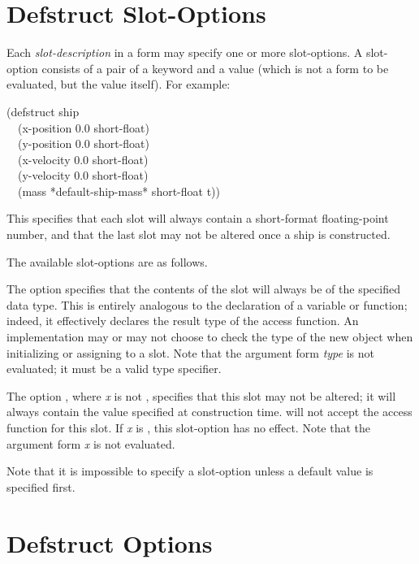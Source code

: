 \section{Defstruct Slot-Options}
\label{Defstruct-Slot-Options}

Each \emph{slot-description} in a  form may specify one or more
slot-options.  A slot-option consists of a pair of a keyword and
a value (which is not a form to be evaluated, but the value itself).
For example:
\begin{lisp}
(defstruct ship \\
~~(x-position 0.0  short-float) \\
~~(y-position 0.0  short-float) \\
~~(x-velocity 0.0  short-float) \\
~~(y-velocity 0.0  short-float) \\
~~(mass *default-ship-mass*  short-float  t))
\end{lisp}
This specifies that each slot will always contain a
short-format floating-point number,
and that the last slot may not be altered once a ship is constructed.

The available slot-options are as follows.
\begin{flushdesc}
\item[\cd{:type}]
The option  specifies that the contents of the
slot will always be of the specified data type.  This is entirely
analogous to the declaration of a variable or function; indeed, it
effectively declares the result type of the access function.  An
implementation may or may not choose to check the type of the new object
when initializing or assigning to a slot.
Note that the argument form \emph{type} is not evaluated;
it must be a valid type specifier.

\item[\cd{:read-only}]
The option , where \emph{x} is not {\false},
specifies that this slot may not be
altered; it will always contain the value specified at construction time.
 will not accept the access function for this slot.
If \emph{x} is {\false}, this slot-option has no effect.
Note that the argument form \emph{x} is not evaluated.
\end{flushdesc}

Note that it is impossible to specify a slot-option unless
a default value is specified first.

\section{Defstruct Options}
\label{DEFSTRUCT-OPTIONS}
\label{Defstruct-Hairy-Stuff}

